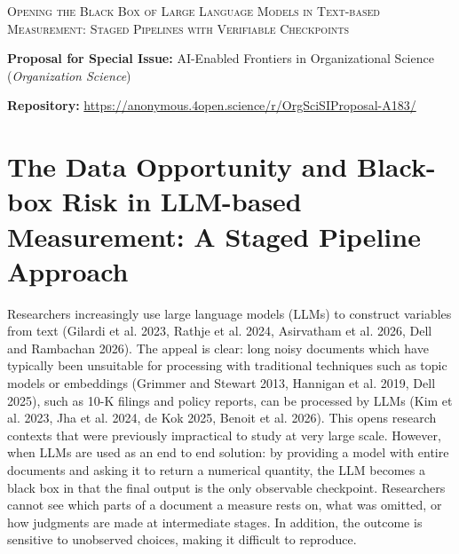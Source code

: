 \documentclass[11pt]{article}
\begin{document}
\begin{center}
    {\LARGE \textsc{Opening the Black Box of Large Language Models in Text-based Measurement: Staged Pipelines with Verifiable Checkpoints}\par}
    \vspace{1.2em}
    {\footnotesize\textbf{Proposal for Special Issue:} AI-Enabled Frontiers in Organizational Science (\textit{Organization Science})\par}
    \vspace{0.3em}
    {\footnotesize\textbf{Repository:} \url{https://anonymous.4open.science/r/OrgSciSIProposal-A183/}\par}
\end{center}

\vspace{1.5em}

\section{The Data Opportunity and Black-box Risk in LLM-based Measurement: A Staged Pipeline Approach}

Researchers increasingly use large language models (LLMs) to construct variables from text (Gilardi et al. 2023, Rathje et al. 2024, Asirvatham et al. 2026, Dell and Rambachan 2026). The appeal is clear: long noisy documents which have typically been unsuitable for processing with traditional techniques such as topic models or embeddings (Grimmer and Stewart 2013, Hannigan et al. 2019, Dell 2025), such as 10-K filings and policy reports, can be processed by LLMs (Kim et al. 2023, Jha et al. 2024, de Kok 2025, Benoit et al. 2026). This opens research contexts that were previously impractical to study at very large scale. However, when LLMs are used as an end to end solution: by providing a model with entire documents and asking it to return a numerical quantity, the LLM becomes a black box in that the final output is the only observable checkpoint. Researchers cannot see which parts of a document a measure rests on, what was omitted, or how judgments are made at intermediate stages. In addition, the outcome is sensitive to unobserved choices, making it difficult to reproduce.
\end{document}
